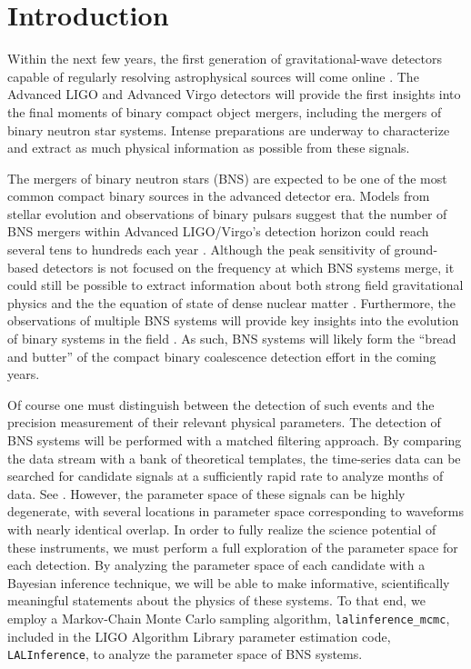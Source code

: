\documentclass[11pt,a4paper]{emulateapj} 
\newcommand{\will}[1]{{\color{cyan} #1}}
\begin{document}
\section{Introduction}

Within the next few years, the first generation of gravitational-wave
detectors capable of regularly resolving astrophysical sources will
come online \citep{AdvLIGO,AdvVirgo}.  The Advanced LIGO and Advanced Virgo
detectors will provide the first insights into the final moments of
binary compact object mergers, including the mergers of binary neutron
star systems.  Intense preparations are underway to characterize and
extract as much physical information as possible from these signals.
 
The mergers of binary neutron stars (BNS) are expected to be one of the most
common compact binary sources in the advanced detector era.  %
  Models from stellar
evolution and observations of binary pulsars suggest that the number
of BNS mergers within Advanced LIGO/Virgo's detection
horizon could reach several tens to hundreds each year
\citep{RatesPaper}.  Although the peak sensitivity of ground-based
detectors is not focused on the frequency at which BNS systems merge,
it could still be possible to extract information about both strong
field gravitational physics \citep{Li2012} and the the equation of state of
dense nuclear matter
\citep{HindererBNS2010}.  Furthermore, the observations of multiple BNS systems
will provide key insights into the evolution of binary systems in the
field \citep{VickyRates,KimRates} . As such, BNS systems will likely
form the ``bread and butter'' of the compact binary coalescence
detection effort in the coming years.


Of course one must distinguish between the detection of such events
and the precision measurement of their relevant physical parameters.
The detection of BNS systems will be performed with a matched
filtering approach.  By comparing the data stream with a bank of
theoretical templates, the time-series data can be searched for
candidate signals at a sufficiently rapid rate to analyze months of
data.  See \cite{S6search}.  However, the parameter space
of these signals can be highly degenerate, with several locations in
parameter space corresponding to waveforms with nearly identical overlap.  In order
to fully realize the science potential of these instruments, we must
perform a full exploration of the parameter space for each detection.
By analyzing the parameter space of each candidate with a Bayesian
inference technique, we will be able to make informative, scientifically
meaningful statements about the physics of these systems.  To that
end, we employ a Markov-Chain Monte Carlo sampling algorithm,
\texttt{lalinference\_mcmc}, included in the LIGO Algorithm Library
parameter estimation code, \texttt{LALInference}, to analyze the
parameter space of BNS systems.
\end{document}
